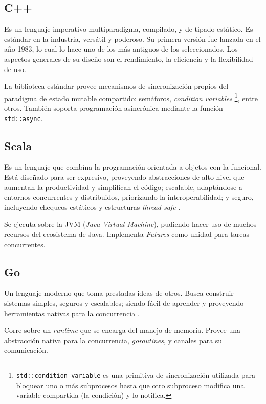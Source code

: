 \documentclass[11pt]{article}
\let\Oldsubsection\subsection
\renewcommand{\subsection}{\FloatBarrier\Oldsubsection}
\newcommand{\english}[1]{\textit{#1}}
\newcommand{\technical}[1]{\textit{#1}}
\begin{document}
\subsection{C++}

Es un lenguaje imperativo multiparadigma, compilado, y de tipado estático. Es estándar en la industria, versátil y poderoso. Su primera versión fue lanzada en el año 1983, lo cual lo hace uno de los más antiguos de los seleccionados. Los aspectos generales de su diseño son el rendimiento, la eficiencia y la flexibilidad de uso.

La biblioteca estándar provee mecanismos de sincronización propios del paradigma de estado mutable compartido: semáforos, \english{condition variables} \footnote{\lstinline{std::condition_variable} es una primitiva de sincronización utilizada para bloquear uno o más subprocesos hasta que otro subproceso modifica una variable compartida (la condición) y lo notifica.}, entre otros. También soporta programación asincrónica mediante la función \lstinline{std::async}.

\subsection{Scala}

Es un lenguaje que combina la programación orientada a objetos con la funcional. Está diseñado para ser expresivo, proveyendo abstracciones de alto nivel que aumentan la productividad y simplifican el código; escalable, adaptándose a entornos concurrentes y distribuidos, priorizando la interoperabilidad; y seguro, incluyendo chequeos estáticos y estructuras \english{thread-safe} \cite{com:scala}.

Se ejecuta sobre la JVM (\technical{Java Virtual Machine}), pudiendo hacer uso de muchos recursos del ecosistema de Java. Implementa \english{Futures} como unidad para tareas concurrentes.

\subsection{Go}

Un lenguaje moderno que toma prestadas ideas de otros. Busca construir sistemas simples, seguros y escalables; siendo fácil de aprender y proveyendo herramientas nativas para la concurrencia \cite{com:go}.

Corre sobre un \english{runtime} que se encarga del manejo de memoria. Provee una abstracción nativa para la concurrencia, \technical{goroutines}, y canales para su comunicación.
\end{document}
